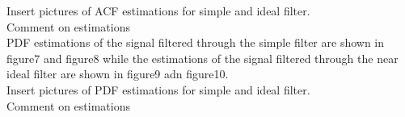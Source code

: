 \documentclass[10pt]{article}
\begin{document}
Insert pictures of ACF estimations for simple and ideal filter.\\

Comment on estimations\\

PDF estimations of the signal filtered through the simple filter are shown in figure7 and figure8 while the estimations of the signal filtered through the near ideal filter are shown in figure9 adn figure10.\\

Insert pictures of PDF estimations for simple and ideal filter.\\

Comment on estimations\\
\end{document}
